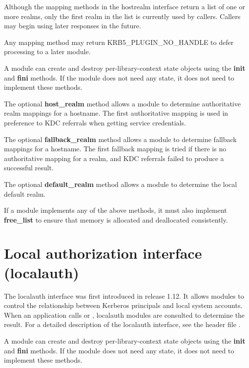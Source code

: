 \documentclass[letterpaper,10pt,english]{sphinxmanual}
\begin{document}
Although the mapping methods in the hostrealm interface return a list
of one or more realms, only the first realm in the list is currently
used by callers.  Callers may begin using later responses in the
future.

Any mapping method may return KRB5\_PLUGIN\_NO\_HANDLE to defer
processing to a later module.

A module can create and destroy per-library-context state objects
using the \textbf{init} and \textbf{fini} methods.  If the module does not need
any state, it does not need to implement these methods.

The optional \textbf{host\_realm} method allows a module to determine
authoritative realm mappings for a hostname.  The first authoritative
mapping is used in preference to KDC referrals when getting service
credentials.

The optional \textbf{fallback\_realm} method allows a module to determine
fallback mappings for a hostname.  The first fallback mapping is tried
if there is no authoritative mapping for a realm, and KDC referrals
failed to produce a successful result.

The optional \textbf{default\_realm} method allows a module to determine the
local default realm.

If a module implements any of the above methods, it must also
implement \textbf{free\_list} to ensure that memory is allocated and
deallocated consistently.


\section{Local authorization interface (localauth)}
\label{plugindev/localauth:local-authorization-interface-localauth}\label{plugindev/localauth:localauth-plugin}\label{plugindev/localauth::doc}
The localauth interface was first introduced in release 1.12.  It
allows modules to control the relationship between Kerberos principals
and local system accounts.  When an application calls
 or , localauth
modules are consulted to determine the result.  For a detailed
description of the localauth interface, see the header file
.

A module can create and destroy per-library-context state objects
using the \textbf{init} and \textbf{fini} methods.  If the module does not need
any state, it does not need to implement these methods.
\end{document}
